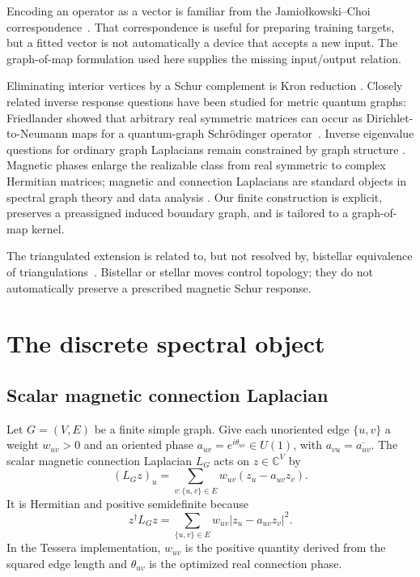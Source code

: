 \documentclass[11pt]{article}
\numberwithin{equation}{section}
\theoremstyle{definition}
\theoremstyle{remark}
\newcommand{\C}{\mathbb{C}}
\begin{document}
Encoding an operator as a vector is familiar from the
Jamio\l kowski--Choi correspondence~\cite{jamiolkowski1972,choi1975}.  That
correspondence is useful for preparing training targets, but a fitted vector is
not automatically a device that accepts a new input.  The graph-of-map
formulation used here supplies the missing input/output relation.

Eliminating interior vertices by a Schur complement is Kron reduction
\cite{dorfler2013}.  Closely related inverse response questions have been
studied for metric quantum graphs: Friedlander showed that arbitrary real
symmetric matrices can occur as Dirichlet-to-Neumann maps for a quantum-graph
Schr\"odinger operator~\cite{friedlander2017}.  Inverse eigenvalue questions for
ordinary graph Laplacians remain constrained by graph structure
\cite{fallat2024}.  Magnetic phases enlarge the realizable class from real
symmetric to complex Hermitian matrices; magnetic and connection Laplacians
are standard objects in spectral graph theory and data analysis
\cite{fabila2018,singer2012}.  Our finite construction is explicit, preserves a
preassigned induced boundary graph, and is tailored to a graph-of-map kernel.

The triangulated extension is related to, but not resolved by, bistellar
equivalence of triangulations~\cite{pachner1991}.  Bistellar or stellar moves
control topology; they do not automatically preserve a prescribed magnetic
Schur response.

\section{The discrete spectral object}
\label{sec:operator}

\subsection{Scalar magnetic connection Laplacian}

Let $G=(V,E)$ be a finite simple graph.  Give each unoriented edge
$\{u,v\}$ a weight $w_{uv}>0$ and an oriented phase
$a_{uv}=e^{i\theta_{uv}}\in U(1)$, with $a_{vu}=\overline{a_{uv}}$.  The scalar
magnetic connection Laplacian $L_G$ acts on $z\in\C^V$ by
\begin{equation}
  (L_Gz)_u=\sum_{v:\{u,v\}\in E}w_{uv}(z_u-a_{uv}z_v).
  \label{eq:magnetic-laplacian}
\end{equation}
It is Hermitian and positive semidefinite because
\begin{equation}
  z^\dagger L_Gz
  =\sum_{\{u,v\}\in E}w_{uv}\lvert z_u-a_{uv}z_v\rvert^2.
  \label{eq:energy}
\end{equation}
In the Tessera implementation, $w_{uv}$ is the positive quantity derived from
the squared edge length and $\theta_{uv}$ is the optimized real connection
phase.
\end{document}
